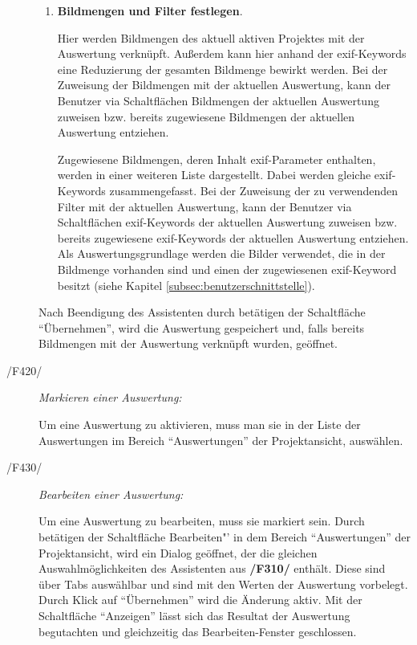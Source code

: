 \begin{description}
\begin{enumerate}
				\item \textbf{Bildmengen und Filter festlegen}.\par Hier werden Bildmengen des aktuell aktiven Projektes mit der Auswertung verknüpft. Außerdem kann hier anhand der \gls{exif}-Keywords eine Reduzierung der gesamten Bildmenge bewirkt werden. Bei der Zuweisung der Bildmengen mit der aktuellen Auswertung, kann der Benutzer via Schaltflächen Bildmengen der aktuellen Auswertung zuweisen bzw. bereits zugewiesene Bildmengen der aktuellen Auswertung entziehen. 
				
				Zugewiesene Bildmengen, deren Inhalt \gls{exif}-Parameter enthalten, werden in einer weiteren Liste dargestellt.  Dabei werden gleiche \gls{exif}-Keywords zusammengefasst. Bei der Zuweisung der zu verwendenden Filter mit der aktuellen Auswertung, kann der Benutzer via Schaltflächen \gls{exif}-Keywords der aktuellen Auswertung zuweisen bzw. bereits zugewiesene \gls{exif}-Keywords der aktuellen Auswertung entziehen. Als Auswertungsgrundlage werden die Bilder verwendet, die in der Bildmenge vorhanden sind und einen der zugewiesenen \gls{exif}-Keyword besitzt (siehe Kapitel \ref{subsec:benutzerschnittstelle}). 

			\end{enumerate}

			Nach Beendigung des Assistenten durch betätigen der Schaltfläche "`Übernehmen"', wird die Auswertung gespeichert und, falls bereits Bildmengen mit der Auswertung verknüpft wurden, geöffnet.
		
		\item[/F420/] \textit{Markieren einer Auswertung:}\par Um eine Auswertung zu aktivieren, muss man sie in der Liste der Auswertungen im Bereich "`Auswertungen"' der Projektansicht, auswählen.
		
		\item[/F430/] \textit{Bearbeiten einer Auswertung:}\par Um eine Auswertung zu bearbeiten, muss sie markiert sein. Durch betätigen der Schaltfläche Bearbeiten"' in dem Bereich "`Auswertungen"' der Projektansicht, wird ein Dialog geöffnet, der die gleichen Auswahlmöglichkeiten des Assistenten aus \textbf{/F310/} enthält. Diese sind über Tabs auswählbar und sind mit den Werten der Auswertung vorbelegt. 
		Durch Klick auf "`Übernehmen"' wird die Änderung aktiv. Mit der Schaltfläche "`Anzeigen"' lässt sich das Resultat der Auswertung begutachten und gleichzeitig das Bearbeiten-Fenster geschlossen.
		

\end{description}
